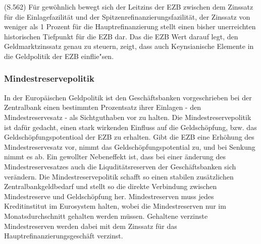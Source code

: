 \documentclass[
    onecolumn,
    a4paper,
    abstracton,
    parskip=half
    ,final
    ]{scrartcl}
\begin{document}
(S.562)
F{\"u}r gew{\"o}hnlich bewegt sich der Leitzins der EZB zwischen dem Zinssatz f{\"u}r die Einlagefazilit{\"a}t und der Spitzenrefinanzierungsfazilit{\"a}t, der Zinssatz von weniger als 1 Prozent f{\"u}r die Hauptrefinanzierung stellt einen bisher unerreichten historischen Tiefpunkt f{\"u}r die EZB dar.
Das die EZB Wert darauf legt, den Geldmarktzinssatz genau zu steuern, zeigt, dass auch Keynsianische Elemente in die Geldpolitik der EZB einflie{"s}en.

\subsubsection{Mindestreservepolitik}
In der Europ{\"a}ischen Geldpolitik ist den Gesch{\"a}ftsbanken  vorgeschrieben bei der Zentralbank einen bestimmten Prozentsatz ihrer Einlagen - den Mindestreservesatz -  als Sichtguthaben vor zu halten. Die Mindestreservepolitik ist daf{\"u}r gedacht, einen stark wirkenden Einfluss auf die Geldsch{\"o}pfung, bzw. das Geldsch{\"o}pfungspotentioal der EZB zu erhalten. Gibt die EZB eine Erh{\"o}hung des Mindestreservesatz vor, nimmt das Geldsch{\"o}pfungspotential zu, und  bei Senkung nimmt es ab. Ein gewollter Nebeneffekt ist, dass bei einer {\"a}nderung des Mindestreservesatzes auch die Liqudit{\"a}tsreserven der Gesch{\"a}ftsbanken sich ver{\"a}ndern.
Die Mindestreservepolitik schafft so einen stabilen zus{\"a}tzlichen Zentralbankgeldbedarf und stellt so die direkte Verbindung zwischen Mindestreserve und Geldsch{\"o}pfung her.
Mindestreserven muss jedes Kreditinstitut im Eurosystem halten, wobei die Mindestreserven nur im Monatsdurchschnitt gehalten werden m{\"u}ssen. Gehaltene verzinste Mindestreserven werden dabei mit dem Zinssatz f{\"u}r das Hauptrefinanzierungsgesch{\"a}ft verzinst.
\end{document}
